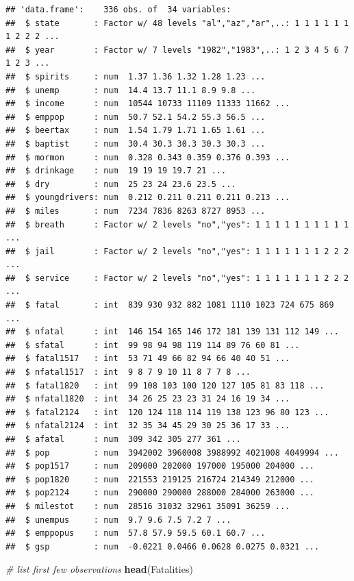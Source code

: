 \documentclass[]{book}
\newenvironment{Shaded}{\begin{snugshade}}{\end{snugshade}}
\newcommand{\KeywordTok}[1]{\textcolor[rgb]{0.13,0.29,0.53}{\textbf{#1}}}
\newcommand{\CommentTok}[1]{\textcolor[rgb]{0.56,0.35,0.01}{\textit{#1}}}
\newcommand{\NormalTok}[1]{#1}
\theoremstyle{definition}
\theoremstyle{definition}
\theoremstyle{definition}
\theoremstyle{remark}
\begin{document}
\begin{verbatim}
## 'data.frame':    336 obs. of  34 variables:
##  $ state       : Factor w/ 48 levels "al","az","ar",..: 1 1 1 1 1 1 1 2 2 2 ...
##  $ year        : Factor w/ 7 levels "1982","1983",..: 1 2 3 4 5 6 7 1 2 3 ...
##  $ spirits     : num  1.37 1.36 1.32 1.28 1.23 ...
##  $ unemp       : num  14.4 13.7 11.1 8.9 9.8 ...
##  $ income      : num  10544 10733 11109 11333 11662 ...
##  $ emppop      : num  50.7 52.1 54.2 55.3 56.5 ...
##  $ beertax     : num  1.54 1.79 1.71 1.65 1.61 ...
##  $ baptist     : num  30.4 30.3 30.3 30.3 30.3 ...
##  $ mormon      : num  0.328 0.343 0.359 0.376 0.393 ...
##  $ drinkage    : num  19 19 19 19.7 21 ...
##  $ dry         : num  25 23 24 23.6 23.5 ...
##  $ youngdrivers: num  0.212 0.211 0.211 0.211 0.213 ...
##  $ miles       : num  7234 7836 8263 8727 8953 ...
##  $ breath      : Factor w/ 2 levels "no","yes": 1 1 1 1 1 1 1 1 1 1 ...
##  $ jail        : Factor w/ 2 levels "no","yes": 1 1 1 1 1 1 1 2 2 2 ...
##  $ service     : Factor w/ 2 levels "no","yes": 1 1 1 1 1 1 1 2 2 2 ...
##  $ fatal       : int  839 930 932 882 1081 1110 1023 724 675 869 ...
##  $ nfatal      : int  146 154 165 146 172 181 139 131 112 149 ...
##  $ sfatal      : int  99 98 94 98 119 114 89 76 60 81 ...
##  $ fatal1517   : int  53 71 49 66 82 94 66 40 40 51 ...
##  $ nfatal1517  : int  9 8 7 9 10 11 8 7 7 8 ...
##  $ fatal1820   : int  99 108 103 100 120 127 105 81 83 118 ...
##  $ nfatal1820  : int  34 26 25 23 23 31 24 16 19 34 ...
##  $ fatal2124   : int  120 124 118 114 119 138 123 96 80 123 ...
##  $ nfatal2124  : int  32 35 34 45 29 30 25 36 17 33 ...
##  $ afatal      : num  309 342 305 277 361 ...
##  $ pop         : num  3942002 3960008 3988992 4021008 4049994 ...
##  $ pop1517     : num  209000 202000 197000 195000 204000 ...
##  $ pop1820     : num  221553 219125 216724 214349 212000 ...
##  $ pop2124     : num  290000 290000 288000 284000 263000 ...
##  $ milestot    : num  28516 31032 32961 35091 36259 ...
##  $ unempus     : num  9.7 9.6 7.5 7.2 7 ...
##  $ emppopus    : num  57.8 57.9 59.5 60.1 60.7 ...
##  $ gsp         : num  -0.0221 0.0466 0.0628 0.0275 0.0321 ...
\end{verbatim}

\begin{Shaded}
\begin{Highlighting}[]
\CommentTok{# list first few observations}
\KeywordTok{head}\NormalTok{(Fatalities)}
\end{Highlighting}
\end{Shaded}
\end{document}
